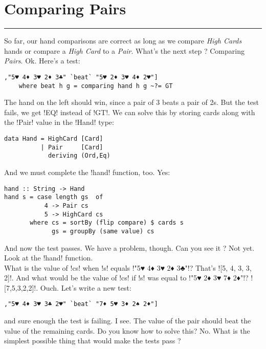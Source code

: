 \newpage
\section{Comparing Pairs} 
\vspace{10cm}
\hrule

\lhQ So far, our hand comparisons are correct as long as we compare \emph{High Cards} hands or compare a \emph{High Card} to a \emph{Pair}. What's the next step ?
\lhA Comparing \emph{Pairs}.
\lhN Ok. Here's a test:
\begin{lstlisting}[frame=single]
,"5♥ 4♦ 3♥ 2♦ 3♣" `beat` "5♥ 2♦ 3♥ 4♦ 2♥"]
    where beat h g = comparing hand h g ~?= GT
\end{lstlisting}
The hand on the left should win, since a pair of 3 beats a pair of 2s. But the test fails, we get \il!EQ! instead of \il!GT!.
\lhA \failure We can solve this by storing cards along with the \il!Pair! value in the \il!Hand! type:
\begin{lstlisting}[frame=single]
data Hand = HighCard [Card]
          | Pair     [Card]
            deriving (Ord,Eq)
\end{lstlisting}
\lhN And we must complete the \il!hand! function, too.
\lhA \error Yes:
\begin{lstlisting}[frame=single]
hand :: String -> Hand
hand s = case length gs  of
           4 -> Pair cs
           5 -> HighCard cs 
       where cs = sortBy (flip compare) $ cards s
             gs = groupBy (same value) cs
\end{lstlisting} %
\success And now the test passes.
\lhN We have a problem, though. Can you see it ?
\lhA Not yet.
\lhN Look at the \il!hand! function. \\ What is the value of \il!cs! when \il!s! equals \il!"5♥ 4♦ 3♥ 2♦ 3♣"!?
\lhA That's \il![5, 4, 3, 3, 2]!.
\lhN And what would be the value of \il!cs! if \il!s! was equal to  \il!"5♥ 2♦ 3♥ 7♦ 2♦"!?
\lhA \il![7,5,3,2,2]!. Ouch.
\lhN Let's write a new test:
\begin{lstlisting}[frame=single]
    ,"5♥ 4♦ 3♥ 3♣ 2♥" `beat` "7♦ 5♥ 3♦ 2♠ 2♦"]
\end{lstlisting}
\failure and sure enough the test is failing.
\lhA \failure I see. The value of the pair should beat the value of the remaining cards.
\lhN Do you know how to solve this?
\lhA No. 
\lhN What is the simplest possible thing that would make the tests pass ?
